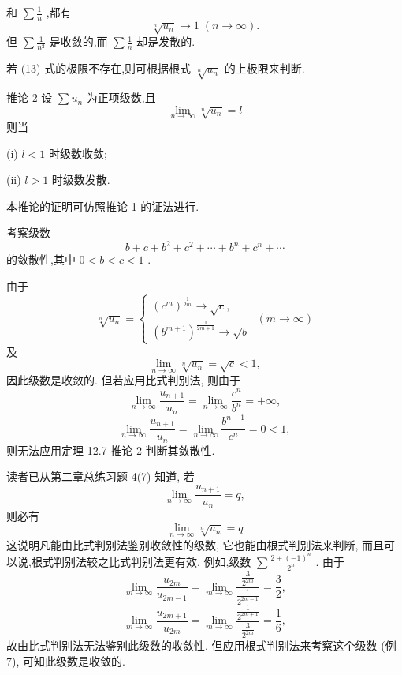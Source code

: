 和 \(\sum \frac{1}{n}\) ,都有
\[
\sqrt[n]{{u}_{n}} \rightarrow  1\;\left( {n \rightarrow  \infty }\right) .
\]
但 \(\sum \frac{1}{{n}^{2}}\) 是收敛的,而 \(\sum \frac{1}{n}\) 却是发散的.

若 (13) 式的极限不存在,则可根据根式 \(\sqrt[n]{{u}_{n}}\) 的上极限来判断.

推论 2 设 \(\sum {u}_{n}\) 为正项级数,且
\[
\mathop{\lim }\limits_{{n \rightarrow  \infty }}\sqrt[n]{{u}_{n}} = l
\]
则当

(i) \(l < 1\) 时级数收敛;

(ii) \(l > 1\) 时级数发散.

本推论的证明可仿照推论 1 的证法进行.

\begin{example}

\end{example}
考察级数
\[
b + c + {b}^{2} + {c}^{2} + \cdots  + {b}^{n} + {c}^{n} + \cdots
\]
的敛散性,其中 \(0 < b < c < 1\) .

\begin{solution}

\end{solution}
由于
\[
\sqrt[n]{{u}_{n}} = \left\{  {\begin{array}{l} {\left( {c}^{m}\right) }^{\frac{1}{2m}} \rightarrow  \sqrt{c}, \\  {\left( {b}^{m + 1}\right) }^{\frac{1}{{2m} + 1}} \rightarrow  \sqrt{b} \end{array}\;\left( {m \rightarrow  \infty }\right) }\right.
\]
及
\[
\mathop{\lim }\limits_{{n \rightarrow  \infty }}\sqrt[n]{{u}_{n}} = \sqrt{c} < 1,
\]
因此级数是收敛的. 但若应用比式判别法, 则由于
\[
\mathop{\lim }\limits_{{n \rightarrow  \infty }}\frac{{u}_{n + 1}}{{u}_{n}} = \mathop{\lim }\limits_{{n \rightarrow  \infty }}\frac{{c}^{n}}{{b}^{n}} =  + \infty ,
\]
\[
\mathop{\lim }\limits_{{n \rightarrow  \infty }}\frac{{u}_{n + 1}}{{u}_{n}} = \mathop{\lim }\limits_{{n \rightarrow  \infty }}\frac{{b}^{n + 1}}{{c}^{n}} = 0 < 1,
\]
则无法应用定理 12.7 推论 2 判断其敛散性.

读者已从第二章总练习题 4(7) 知道, 若
\[
\mathop{\lim }\limits_{{n \rightarrow  \infty }}\frac{{u}_{n + 1}}{{u}_{n}} = q,
\]
则必有
\[
\mathop{\lim }\limits_{{n \rightarrow  \infty }}\sqrt[n]{{u}_{n}} = q
\]
这说明凡能由比式判别法鉴别收敛性的级数, 它也能由根式判别法来判断, 而且可以说,根式判别法较之比式判别法更有效. 例如,级数 \(\sum \frac{2 + {\left( -1\right) }^{n}}{{2}^{n}}\) . 由于
\[
\mathop{\lim }\limits_{{m \rightarrow  \infty }}\frac{{u}_{2m}}{{u}_{{2m} - 1}} = \mathop{\lim }\limits_{{m \rightarrow  \infty }}\frac{\frac{3}{{2}^{2m}}}{\frac{1}{{2}^{{2m} - 1}}} = \frac{3}{2},
\]
\[
\mathop{\lim }\limits_{{m \rightarrow  \infty }}\frac{{u}_{{2m} + 1}}{{u}_{2m}} = \mathop{\lim }\limits_{{m \rightarrow  \infty }}\frac{\frac{1}{{2}^{{2m} + 1}}}{\frac{3}{{2}^{2m}}} = \frac{1}{6},
\]
故由比式判别法无法鉴别此级数的收敛性. 但应用根式判别法来考察这个级数 (例 7), 可知此级数是收敛的.


